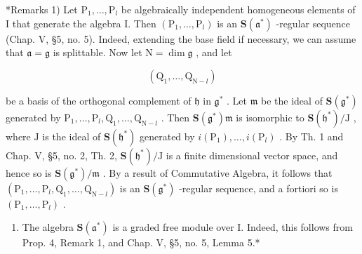 *Remarks 1) Let \(\mathrm{P}_1, \ldots, \mathrm{P}_l\) be algebraically independent homogeneous elements of I that generate the algebra I. Then \((\mathrm{P}_1, \ldots, \mathrm{P}_l)\) is an \(\mathbf{S}(\mathfrak{a}^*)\) -regular sequence (Chap. V, §5, no. 5). Indeed, extending the base field if necessary, we can assume that \(\mathfrak{a} = \mathfrak{g}\) is splittable. Now let \(\mathrm{N} = \dim \mathfrak{g}\) , and let

\[
\left(\mathrm{Q} _ {1}, \dots , \mathrm{Q} _ {\mathrm{N} - l}\right)
\]

be a basis of the orthogonal complement of \(\mathfrak{h}\) in \(\mathfrak{g}^*\) . Let \(\mathfrak{m}\) be the ideal of \(\mathbf{S}(\mathfrak{g}^*)\) generated by \(\mathrm{P}_1, \ldots, \mathrm{P}_l, \mathrm{Q}_1, \ldots, \mathrm{Q}_{\mathrm{N}-l}\) . Then \(\mathbf{S}(\mathfrak{g}^*)\mathfrak{m}\) is isomorphic to \(\mathbf{S}(\mathfrak{h}^*)/\mathrm{J}\) , where \(\mathrm{J}\) is the ideal of \(\mathbf{S}(\mathfrak{h}^*)\) generated by \(i(\mathrm{P}_1), \ldots, i(\mathrm{P}_l)\) . By Th. 1 and Chap. V, §5, no. 2, Th. 2, \(\mathbf{S}(\mathfrak{h}^*)/\mathrm{J}\) is a finite dimensional vector space, and hence so is \(\mathbf{S}(\mathfrak{g}^*)/\mathfrak{m}\) . By a result of Commutative Algebra, it follows that \((\mathrm{P}_1, \ldots, \mathrm{P}_l, \mathrm{Q}_1, \ldots, \mathrm{Q}_{\mathrm{N}-l})\) is an \(\mathbf{S}(\mathfrak{g}^*)\) -regular sequence, and a fortiori so is \((\mathrm{P}_1, \ldots, \mathrm{P}_l)\) .

\begin{enumerate}
\def\labelenumi{\arabic{enumi})}
\setcounter{enumi}{1}
\tightlist
\item
  The algebra \(\mathbf{S}(\mathfrak{a}^*)\) is a graded free module over I. Indeed, this follows from Prop. 4, Remark 1, and Chap. V, §5, no. 5, Lemma 5.*
\end{enumerate}

